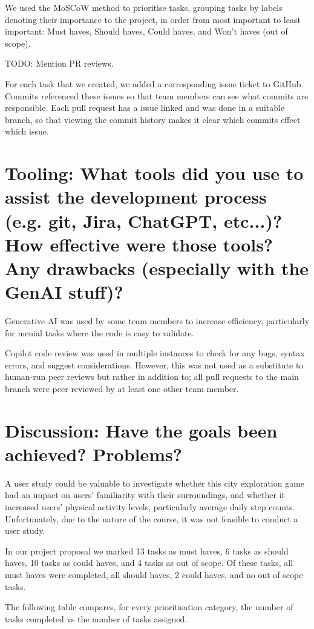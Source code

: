 \documentclass{vgtc}                          %
\begin{document}
We used the MoSCoW method to prioritise tasks, grouping tasks by labels denoting their importance to the project, in order from most important to least important: Must haves, Should haves, Could haves, and Won't haves (out of scope).

{TODO: Mention PR reviews.}

For each task that we created, we added a corresponding issue ticket to GitHub. Commits referenced these issues so that team members can see what commits are responsible. Each pull request has a issue linked and was done in a suitable branch, so that viewing the commit history makes it clear which commits effect which issue.

\section{Tooling: What tools did you use to assist the development process (e.g. git, Jira, ChatGPT, etc...)? How effective were those tools? Any drawbacks (especially with the GenAI stuff)?}

Generative AI was used by some team members to increase efficiency, particularly for menial tasks where the code is easy to validate. 

Copilot code review was used in multiple instances to check for any bugs, syntax errors, and suggest considerations. However, this was not used as a substitute to human-run peer reviews but rather in addition to; all pull requests to the main branch were peer reviewed by at least one other team member.

\section{Discussion: Have the goals been achieved? Problems?}

A user study could be valuable to investigate whether this city exploration game had an impact on users' familiarity with their surroundings, and whether it increased users' physical activity levels, particularly average daily step counts. Unfortunately, due to the nature of the course, it was not feasible to conduct a user study.

In our project proposal we marked 13 tasks as must haves, 6 tasks as should haves, 10 tasks as could haves, and 4 tasks as out of scope.
Of these tasks, all must haves were completed, all should haves, 2 could haves, and no out of scope tasks.

The following table compares, for every prioritisation category, the number of tasks completed vs the number of tasks assigned.
\end{document}
